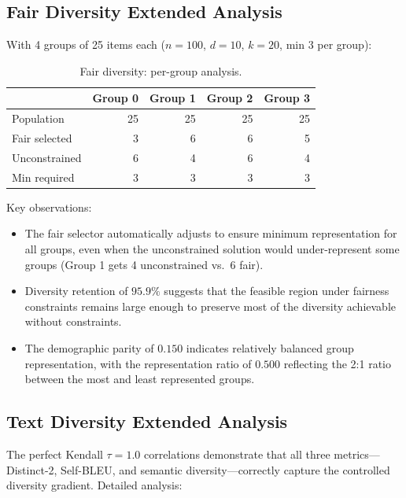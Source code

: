\documentclass[11pt]{article}
\begin{document}
\subsection{Fair Diversity Extended Analysis}

With 4 groups of 25 items each ($n{=}100$, $d{=}10$, $k{=}20$, min 3 per group):

\begin{table}[H]
\centering
\caption{Fair diversity: per-group analysis.}
\label{tab:fair-extended}
\begin{tabular}{lrrrr}
\toprule
& \textbf{Group 0} & \textbf{Group 1} & \textbf{Group 2} & \textbf{Group 3} \\
\midrule
Population & 25 & 25 & 25 & 25 \\
Fair selected & 3 & 6 & 6 & 5 \\
Unconstrained & 6 & 4 & 6 & 4 \\
Min required & 3 & 3 & 3 & 3 \\
\bottomrule
\end{tabular}
\end{table}

Key observations:
\begin{itemize}[leftmargin=*]
\item The fair selector automatically adjusts to ensure minimum representation
  for all groups, even when the unconstrained solution would under-represent
  some groups (Group 1 gets 4 unconstrained vs.\ 6 fair).
\item Diversity retention of $95.9\%$ suggests that the feasible region
  under fairness constraints remains large enough to preserve most of the
  diversity achievable without constraints.
\item The demographic parity of $0.150$ indicates relatively balanced
  group representation, with the representation ratio of $0.500$ reflecting
  the 2:1 ratio between the most and least represented groups.
\end{itemize}

\subsection{Text Diversity Extended Analysis}

The perfect Kendall $\tau = 1.0$ correlations demonstrate that all three
metrics---Distinct-2, Self-BLEU, and semantic diversity---correctly capture
the controlled diversity gradient. Detailed analysis:
\end{document}
